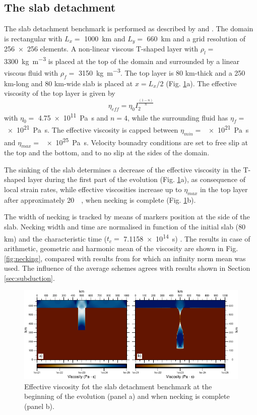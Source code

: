 \documentclass[hidelinks,11pt,a4paper]{article}
\begin{document}
\subsection{The slab detachment}\label{sec:slab}
The slab detachment benchmark is performed as described by \citet{Schmalholz2011} and \citet{Glerum2018}. The domain is rectangular with $L_x=$ \SI{1000}{\km} and $L_y=$ \SI{660}{\km} and a grid resolution of \num{256x256} elements. A non-linear viscous T-shaped layer with $\rho_l=$ \SI{3300}{\kg\per\cubic\metre} is placed at the top of the domain and surrounded by a linear viscous fluid with $\rho_f=$ \SI{3150}{\kg\per\cubic\m}. The top layer is 80 km-thick and a 250 km-long and 80 km-wide slab is placed at $x=L_x/2$ (Fig. \ref{fig:slab}a). The effective viscosity of the top layer is given by
\[\eta_{eff}=\eta_0 I_2^{\frac{(1-n)}{n}}\]
with $\eta_0=$ \SI{4.75e11}{\pascal\s} and $n=4$, while the surrounding fluid has $\eta_f=$ \SI{e21}{\pascal\s}. The effective viscosity is capped between $\eta_{min}=$ \SI{e21}{\pascal\s} and $\eta_{max}=$ \SI{e25}{\pascal\s}. Velocity bounadry conditions are set to free slip at the top and the bottom, and to no slip at the sides of the domain.

The sinking of the slab determines a decrease of the effective viscosity in the T-shaped layer during the first part of the evolution (Fig. \ref{fig:slab}a), as consequence of local strain rates, while effective viscosities increase up to $\eta_{max}$ in the top layer after approximately \SI{20}{\mega\year}, when necking is complete (Fig. \ref{fig:slab}b).

The width of necking is tracked by means of markers position at the side of the slab. Necking width and time are normalised in function of the initial slab (80 km) and the characteristic time ($t_c=$ \SI{7.1158e14}{\s}) \citep{Schmalholz2011,Glerum2018}. The results in case of arithmetic, geometric and harmonic mean of the viscosity are shown in Fig. \ref{fig:necking}, compared with results from \citet{Glerum2018} for which an infinity norm mean was used. The influence of the average schemes agrees with results shown in Section \ref{sec:subduction}.

\begin{figure}
\noindent\includegraphics[width=\textwidth]{./Figures/Slab.pdf}
\caption{Effective viscosity fot the slab detachment benchmark at the beginning of the evolution (panel a) and when necking is complete (panel b).}
\label{fig:slab}
\end{figure}
\end{document}
